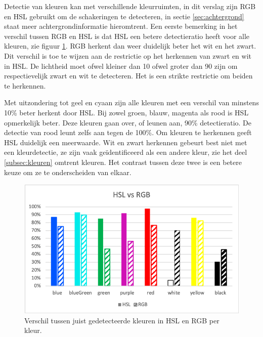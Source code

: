 Detectie van kleuren kan met verschillende kleurruimten, in dit verslag zijn RGB en HSL gebruikt om de schakeringen te detecteren, in sectie \ref{sec:achtergrond} staat meer achtergrondinformatie hieromtrent. Een eerste bemerking in het verschil tussen RGB en HSL is dat HSL een betere detectieratio heeft voor alle kleuren, zie figuur \ref{fig:HSLvsRGB}. RGB herkent dan weer duidelijk beter het wit en het zwart. Dit verschil is toe te wijzen aan de restrictie op het herkennen van zwart en wit in HSL. De lichtheid moet ofwel kleiner dan 10 ofwel groter dan 90 zijn om respectievelijk zwart en wit te detecteren. Het is een strikte restrictie om beiden te herkennen.

Met uitzondering tot geel en cyaan zijn alle kleuren met een verschil van minstens 10\% beter herkent door HSL. Bij zowel groen, blauw, magenta als rood is HSL opmerkelijk beter. Deze kleuren gaan over, of leunen aan, 90\% detectieratio. De detectie van rood leunt zelfs aan tegen de 100\%.
Om kleuren te herkennen geeft HSL duidelijk een meerwaarde. Wit en zwart herkennen gebeurt best niet met een kleurdetectie, ze zijn vaak geïdentificeerd als een andere kleur, zie het deel \ref{subsec:kleuren}  omtrent kleuren. Het contrast tussen deze twee is een betere keuze om ze te onderscheiden van elkaar.

\begin{figure}
	\center
	\includegraphics{img/HSLvsRGB}
	\caption{Verschil tussen juist gedetecteerde kleuren in HSL en RGB per kleur.}
	\label{fig:HSLvsRGB}
\end{figure}

